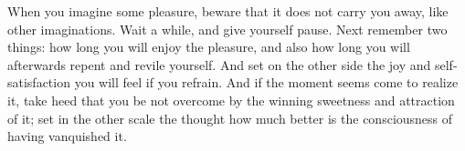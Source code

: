 When you imagine  some pleasure, beware that  it does not carry  you away, like
other imaginations.  Wait a while, and  give yourself pause. Next  remember two
things:  how long  you will  enjoy the  pleasure, and  also how  long you  will
afterwards repent and  revile yourself. And set  on the other side  the joy and
self-satisfaction you will feel if you refrain. And if the moment seems come to
realize it,  take heed that  you be not overcome  by the winning  sweetness and
attraction of  it; set in the  other scale the  thought how much better  is the
consciousness of having vanquished it.

